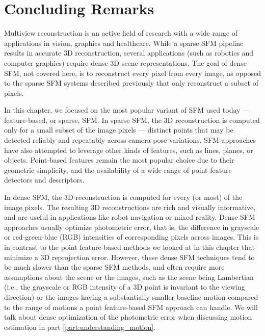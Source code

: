 \section{Concluding Remarks}

Multiview reconstruction is an active field of research with a wide range of applications in vision, graphics and healthcare.
While a sparse SFM pipeline results in accurate 3D reconstruction, several applications (such as robotics and computer graphics) require dense 3D scene representations. The goal of dense SFM, not covered here, is to reconstruct every pixel from every image, as opposed to the sparse SFM systems described previously that only reconstruct a subset of pixels.

In this chapter, we focused on the most popular variant of SFM used today --- feature-based, or sparse, SFM. In sparse SFM, the 3D reconstruction is computed only for a small subset of the image pixels --- distinct points that may be detected reliably and repeatably across camera pose variations. SFM approaches have also attempted to leverage other kinds of features, such as lines, planes, or objects. Point-based features remain the most popular choice due to their geometric simplicity, and the availability of a wide range of point feature detectors and descriptors.

In dense SFM, the 3D reconstruction is computed for every (or most) of the image pixels. The resulting 3D reconstructions are rich and visually informative, and are useful in applications like robot navigation or mixed reality. Dense SFM approaches usually optimize photometric error, that is, the difference in grayscale or red-green-blue (RGB) intensities of corresponding pixels across images. This is in contrast to the point feature-based methods we looked at in this chapter that minimize a 3D reprojection error. However, these dense SFM techniques tend to be much slower than the sparse SFM methods, and often require more assumptions about the scene or the images, such as the scene being Lambertian (i.e., the grayscale or RGB intensity of a 3D point is invariant to the viewing direction) or the images having a substantially smaller baseline motion compared to the range of motions a point feature-based SFM approach can handle. We will talk about dense optimization of the photometric error when discussing motion estimation in part \ref{part:understanding_motion}.

